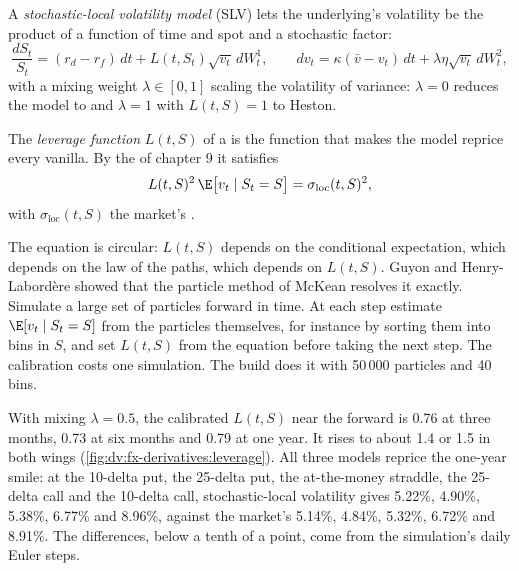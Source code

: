 \begin{definition}\label{def:dv:fx-derivatives:slv}
A \emph{stochastic-local volatility model} (SLV) lets the underlying's volatility be the
product of a function of time and spot and a stochastic factor:
\[
\frac{dS_t}{S_t}=(r_d-r_f)\,dt+L(t,S_t)\sqrt{v_t}\,dW^1_t,\qquad dv_t=\kappa(\bar v-v_t)\,dt+\lambda\eta\sqrt{v_t}\,dW^2_t,
\]
with a mixing weight $\lambda\in[0,1]$ scaling the volatility of variance: $\lambda=0$ reduces the model to  and $\lambda=1$
with $L(t,S)=1$ to Heston.
\end{definition}

\begin{definition}\label{def:dv:fx-derivatives:leverage}
The \emph{leverage function} $L(t,S)$ of a  is the function that makes the model
reprice every vanilla. By the  of chapter 9 it satisfies
\[
L(t,S)^2\,\E\bigl[v_t\mid S_t=S\bigr]=\sigma_{\mathrm{loc}}(t,S)^2,
\]
with $\sigma_{\mathrm{loc}}(t,S)$ the market's .
\end{definition}

The equation is circular: $L(t,S)$ depends on the conditional expectation, which depends on the law of the paths, which depends on $L(t,S)$.
Guyon and Henry-Labord\`ere showed that the particle method of McKean resolves it exactly. Simulate a large set of particles forward in time.
At each step estimate $\E[v_t\mid S_t=S]$ from the particles themselves, for instance by sorting them into bins in $S$, and set
$L(t,S)$ from the equation before taking the next step. The calibration costs one simulation. The build does it with 50\,000 particles
and 40 bins.

\begin{example}\label{ex:dv:fx-derivatives:leverage}
With mixing $\lambda=0.5$, the calibrated $L(t,S)$ near the forward is 0.76 at three months, 0.73 at six months and 0.79 at one year. It
rises to about 1.4 or 1.5 in both wings (\cref{fig:dv:fx-derivatives:leverage}). All three models reprice the one-year smile: at the 10-delta
put, the 25-delta put, the at-the-money straddle, the 25-delta call and the 10-delta call, stochastic-local volatility gives 5.22\%, 4.90\%,
5.38\%, 6.77\% and 8.96\%, against the market's 5.14\%, 4.84\%, 5.32\%, 6.72\% and 8.91\%. The differences, below a tenth of a point, come
from the simulation's daily Euler steps.
\end{example}

